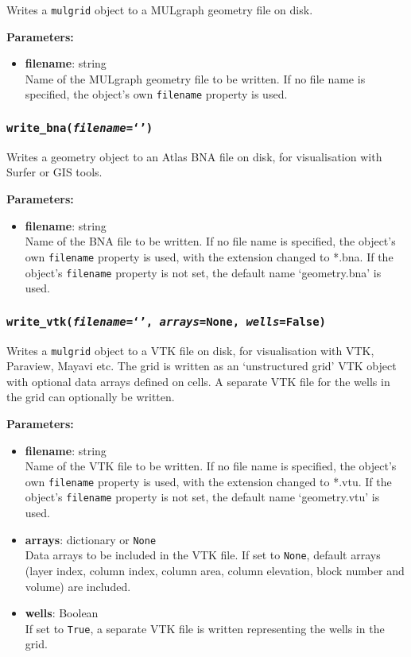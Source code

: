 Writes a \texttt{mulgrid} object to a MULgraph geometry file on disk.

\textbf{Parameters:}
\begin{itemize}
\item \textbf{filename}: string\\
  Name of the MULgraph geometry file to be written.  If no file name is specified, the object's own \texttt{filename} property is used.
\end{itemize}

\subsubsection{\texttt{write\_bna(\emph{filename}=`')}}

Writes a geometry object to an Atlas BNA file on disk, for visualisation with Surfer or GIS tools.

\textbf{Parameters:}
\begin{itemize}
\item \textbf{filename}: string\\
  Name of the BNA file to be written.  If no file name is specified, the object's own \texttt{filename} property is used, with the extension changed to *.bna.  If the object's \texttt{filename} property is not set, the default name `geometry.bna' is used.
\end{itemize}

\subsubsection{\texttt{write\_vtk(\emph{filename}=`', \emph{arrays}=None, \emph{wells}=False)}}

Writes a \texttt{mulgrid} object to a VTK file on disk, for visualisation with VTK, Paraview, Mayavi etc.  The grid is written as an `unstructured grid' VTK object with optional data arrays defined on cells.  A separate VTK file for the wells in the grid can optionally be written.

\textbf{Parameters:}
\begin{itemize}
\item \textbf{filename}: string\\
  Name of the VTK file to be written.  If no file name is specified, the object's own \texttt{filename} property is used, with the extension changed to *.vtu.  If the object's \texttt{filename} property is not set, the default name `geometry.vtu' is used.
\item \textbf{arrays}: dictionary or \texttt{None}\\
  Data arrays to be included in the VTK file.  If set to \texttt{None}, default arrays (layer index, column index, column area, column elevation, block number and volume) are included.
\item \textbf{wells}: Boolean\\
  If set to \texttt{True}, a separate VTK file is written representing the wells in the grid.
\end{itemize}

